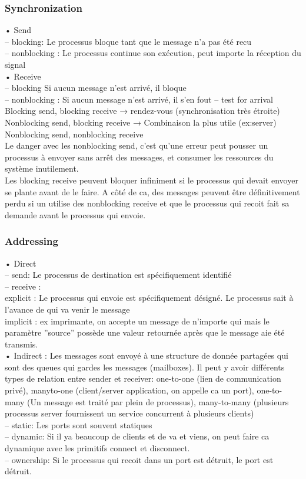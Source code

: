 \subsubsection{Synchronization}
• Send \\
– blocking: Le processus bloque tant que le message n'a pas été recu \\
– nonblocking : Le processus continue son exécution, peut importe la réception du signal \\
• Receive \\
– blocking Si aucun message n'est arrivé, il bloque \\
– nonblocking : Si aucun message n'est arrivé, il s'en fout – test for arrival \\
Blocking send, blocking receive → rendez-vous (synchronisation très étroite) Nonblocking send, blocking receive → Combinaison la plus utile (ex:server) Nonblocking send, nonblocking receive \\
Le danger avec les nonblocking send, c'est qu'une erreur peut pousser un processus à envoyer sans arrêt des messages, et consumer les ressources du système inutilement. \\
Les blocking receive peuvent bloquer infiniment si le processus qui devait envoyer se plante avant de le faire. A côté de ca, des messages peuvent être définitivement perdu si un utilise des nonblocking receive et que le processus qui recoit fait sa demande avant le processus qui envoie.
\subsubsection{Addressing}
• Direct \\
– send: Le processus de destination est spécifiquement identifié  \\
– receive : \\
explicit : Le processus qui envoie est spécifiquement désigné. Le processus sait à l'avance de qui va venir le message \\
implicit : ex imprimante, on accepte un message de n'importe qui mais le paramètre ”source” possède une valeur retournée après que le message aie été transmis. \\
• Indirect : Les messages sont envoyé à une structure de donnée partagées qui sont des queues qui gardes les messages (mailboxes). Il peut y avoir différents types de relation entre sender et receiver: one-to-one (lien de communication privé), manyto-one (client/server application, on appelle ca un port), one-to-many (Un message est traité par plein de processus), many-to-many (plusieurs processus server fournissent un service concurrent à plusieurs clients) \\
– static: Les ports sont souvent statiques \\
– dynamic: Si il ya beaucoup de clients et de va et viens, on peut faire ca
dynamique avec les primitifs connect et disconnect. \\
– ownership: Si le processus qui recoit dans un port est détruit, le port est détruit. \\

